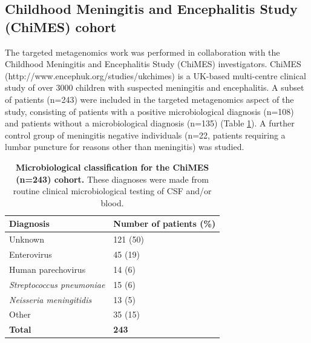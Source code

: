 \subsection{Childhood Meningitis and Encephalitis Study (ChiMES) cohort} 
The targeted metagenomics work was performed in collaboration with the Childhood Meningitis and Encephalitis Study (ChiMES) investigators. ChiMES (http://www.encephuk.org/studies/ukchimes) is a UK-based multi-centre clinical study of over 3000 children with suspected meningitis and encephalitis. A subset of patients (n=243) were included in the targeted metagenomics aspect of the study, consisting of patients with a positive microbiological diagnosis (n=108) and patients without a microbiological diagnosis (n=135) (Table \ref{tab:chimesmicro}). A further control group of meningitis negative individuals (n=22, patients requiring a lumbar puncture for reasons other than meningitis) was studied.

\FloatBarrier
\begin{table}[]
\begin{center}
\begin{tabular}{|l|l|}
\hline
\textbf{Diagnosis}                & \textbf{Number of patients (\%)} \\ \hline
Unknown                           & 121 (50)                         \\ \hline
Enterovirus                       & 45 (19)                          \\ \hline
Human parechovirus                & 14 (6)                           \\ \hline
\textit{Streptococcus pneumoniae} & 15 (6)                           \\ \hline
\textit{Neisseria meningitidis}   & 13 (5)                           \\ \hline
Other                             & 35 (15)                          \\ \hline
\textbf{Total}                    & \textbf{243}                     \\ \hline
\end{tabular}
\end{center}
\smallskip
\caption[ChiMES clinical microbiology classification] {\textbf{Microbiological classification for the ChiMES (n=243) cohort.} These diagnoses were made from routine clinical microbiological testing of CSF and/or blood.} 
\label{tab:chimesmicro}
\end{table}

